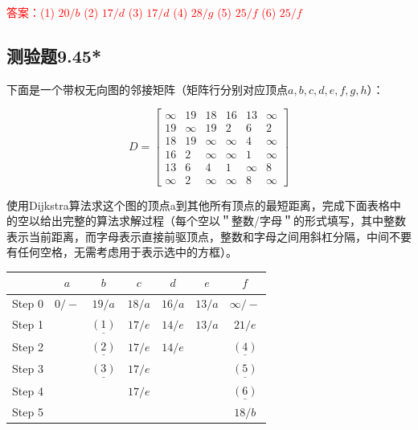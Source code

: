 \documentclass[UTF8, heading=true]{ctexart}
\begin{document}
\textcolor{red}{答案：(1) $20 / b$
(2) $17 / d$
(3) $17 / d$
(4) $28 / g$
(5) $25 / f$
(6) $25 / f$}

\subsection{测验题9.45*}

下面是一个带权无向图的邻接矩阵（矩阵行分别对应顶点$a,b,c,d,e,f,g,h$）：


\begin{table}[H]
\renewcommand{\arraystretch}{1.5}
  $$
D=\left[\begin{array}{cccccc}
\infty & 19 & 18 & 16 & 13 & \infty \\
19 & \infty & 19 & 2 & 6 & 2 \\
18 & 19 & \infty & \infty & 4 & \infty \\
16 & 2 & \infty & \infty & 1 & \infty \\
13 & 6 & 4 & 1 & \infty & 8 \\
\infty & 2 & \infty & \infty & 8 & \infty
\end{array}\right]
$$
\end{table}

使用Dijkstra算法求这个图的顶点a到其他所有顶点的最短距离，完成下面表格中的空以给出完整的算法求解过程（每个空以＂整数/字母＂的形式填写，其中整数表示当前距离，而字母表示直接前驱顶点，整数和字母之间用斜杠分隔，中间不要有任何空格，无需考虑用于表示选中的方框）。

\begin{table}[H]
\renewcommand{\arraystretch}{1.5}
\centering

\begin{tabular}{c|c|c|c|c|c|c}
  \hline  & $a$ & $b$ & $c$ & $d$ & $e$ & $f$ \\
  \hline Step  0 & $\boxed{0} /-$ & $19 / a$ & $18 / a$ & $16 / a$ & $13 / a$ & $\infty /-$ \\
  \hline Step  1 & & $\underline{(1)}$ & $17 / e$ & $14 / e$ & $\boxed{13} / a$ & $21 / e$ \\
  \hline Step  2 & & $\underline{(2)}$ & $17 / e$ & $\boxed{14} / e$ & & $\underline{(4)}$ \\
  \hline Step  3 & & $\underline{(3)}$ & $17 / e$ & & & $\underline{(5)}$ \\
  \hline Step  4 & & & $\boxed{17} / e$ & & & $\underline{(6)}$ \\
  \hline Step  5 & & & & & & $\boxed{18} / b$ \\
  \hline
\end{tabular}

\end{table}
\end{document}
